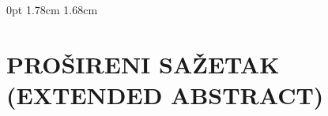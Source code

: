\documentclass[
  12 pt,
]{book}
\begin{document}
{

    \vspace*{0pt}
    
        {0pt} %
        {1.78cm} %
        {1.68cm} %
    
    \singlespacing
    
    \setlength{\parskip}{3pt}
    
    

\hypertarget{prosireni-sazetak-extended-abstract}{%
\section*{PROŠIRENI SAŽETAK (EXTENDED ABSTRACT)}\label{prosireni-sazetak-extended-abstract}}

}
\end{document}
